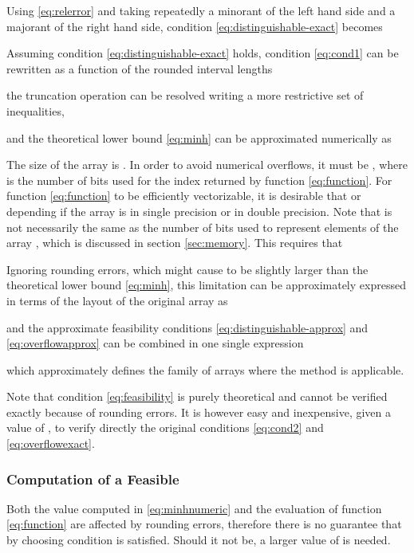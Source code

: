 \documentclass[preprint,1p,times]{elsarticle}
\begin{document}
Using \eqref{eq:relerror} and taking repeatedly a minorant of the left hand side and a majorant of the right hand side, condition \eqref{eq:distinguishable-exact} becomes


Assuming condition \eqref{eq:distinguishable-exact} holds, condition \eqref{eq:cond1} can be rewritten as a function of the rounded interval lengths 

the truncation operation can be resolved writing a more restrictive set of inequalities, 

and the theoretical lower bound \eqref{eq:minh} can be approximated numerically as 


The size of the array  is . In order to avoid numerical overflows, it must be , where  is the number of bits used for the index returned by function \eqref{eq:function}. For function \eqref{eq:function} to be efficiently vectorizable, it is desirable that  or  depending if the array  is in single precision or in double precision. Note that  is not necessarily the same as the number of bits used to represent elements of the array , which is discussed in section \ref{sec:memory}. This requires that

Ignoring rounding errors, which might cause  to be slightly larger than the theoretical lower bound \eqref{eq:minh}, this limitation can be approximately expressed in terms of the layout of the original array  as

and the approximate feasibility conditions \eqref{eq:distinguishable-approx} and \eqref{eq:overflowapprox} can be combined in one single expression

which approximately defines the family of arrays  where the method is applicable.

Note that condition \eqref{eq:feasibility} is purely theoretical and cannot be verified exactly because of rounding errors.
It is however easy and inexpensive, given a value of , to verify directly the original conditions \eqref{eq:cond2} and \eqref{eq:overflowexact}.

\subsubsection{Computation of a Feasible }
\label{sec:feasibleh}
Both the value  computed in \eqref{eq:minhnumeric} and the evaluation of function \eqref{eq:function} are affected by rounding errors, therefore there is no guarantee that by choosing  condition  is satisfied. Should it not be, a larger value of  is needed.
\end{document}
